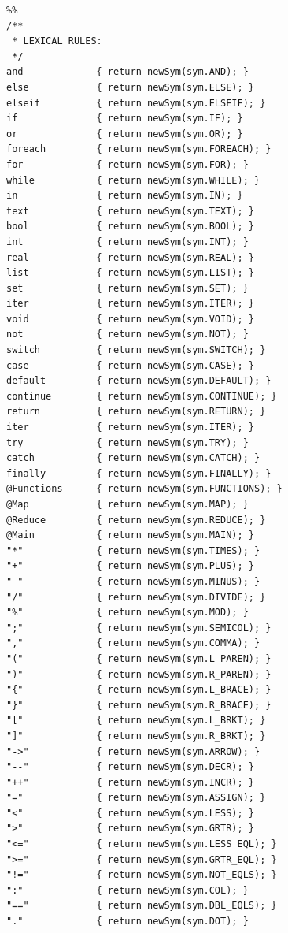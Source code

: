 \documentclass{book}
\begin{document}
\begin{verbatim}
%%
/**
 * LEXICAL RULES:
 */
and             { return newSym(sym.AND); }
else            { return newSym(sym.ELSE); }
elseif          { return newSym(sym.ELSEIF); }
if              { return newSym(sym.IF); }
or              { return newSym(sym.OR); }
foreach         { return newSym(sym.FOREACH); }
for             { return newSym(sym.FOR); }
while           { return newSym(sym.WHILE); }
in              { return newSym(sym.IN); }
text            { return newSym(sym.TEXT); }
bool            { return newSym(sym.BOOL); }
int             { return newSym(sym.INT); }
real            { return newSym(sym.REAL); }
list            { return newSym(sym.LIST); }
set             { return newSym(sym.SET); }
iter            { return newSym(sym.ITER); }
void            { return newSym(sym.VOID); }
not             { return newSym(sym.NOT); }
switch          { return newSym(sym.SWITCH); }
case            { return newSym(sym.CASE); }
default         { return newSym(sym.DEFAULT); }
continue        { return newSym(sym.CONTINUE); }
return          { return newSym(sym.RETURN); }
iter            { return newSym(sym.ITER); }
try             { return newSym(sym.TRY); }
catch           { return newSym(sym.CATCH); }
finally         { return newSym(sym.FINALLY); }
@Functions      { return newSym(sym.FUNCTIONS); }
@Map            { return newSym(sym.MAP); }
@Reduce         { return newSym(sym.REDUCE); }
@Main           { return newSym(sym.MAIN); }
"*"             { return newSym(sym.TIMES); }
"+"             { return newSym(sym.PLUS); }
"-"             { return newSym(sym.MINUS); }
"/"             { return newSym(sym.DIVIDE); }
"%"             { return newSym(sym.MOD); }
";"             { return newSym(sym.SEMICOL); }
","             { return newSym(sym.COMMA); }
"("             { return newSym(sym.L_PAREN); }
")"             { return newSym(sym.R_PAREN); }
"{"             { return newSym(sym.L_BRACE); }
"}"             { return newSym(sym.R_BRACE); }
"["             { return newSym(sym.L_BRKT); }
"]"             { return newSym(sym.R_BRKT); }
"->"            { return newSym(sym.ARROW); }
"--"            { return newSym(sym.DECR); }
"++"            { return newSym(sym.INCR); }
"="             { return newSym(sym.ASSIGN); }
"<"             { return newSym(sym.LESS); }
">"             { return newSym(sym.GRTR); }
"<="            { return newSym(sym.LESS_EQL); }
">="            { return newSym(sym.GRTR_EQL); }
"!="            { return newSym(sym.NOT_EQLS); }
":"             { return newSym(sym.COL); }
"=="            { return newSym(sym.DBL_EQLS); }
"."             { return newSym(sym.DOT); }

\end{verbatim}
\end{document}
